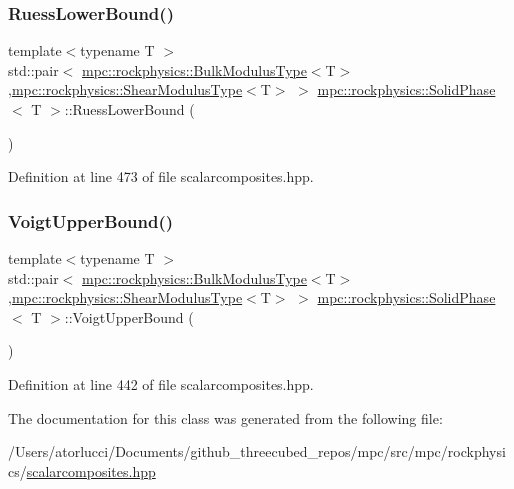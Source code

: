 \subsubsection{\texorpdfstring{Ruess\+Lower\+Bound()}{RuessLowerBound()}}
{\footnotesize\ttfamily template$<$typename T $>$ \\
std\+::pair$<$ \mbox{\hyperlink{structmpc_1_1rockphysics_1_1_bulk_modulus_type}{mpc\+::rockphysics\+::\+Bulk\+Modulus\+Type}}$<$T$>$,\mbox{\hyperlink{structmpc_1_1rockphysics_1_1_shear_modulus_type}{mpc\+::rockphysics\+::\+Shear\+Modulus\+Type}}$<$T$>$ $>$ \mbox{\hyperlink{classmpc_1_1rockphysics_1_1_solid_phase}{mpc\+::rockphysics\+::\+Solid\+Phase}}$<$ T $>$\+::Ruess\+Lower\+Bound (\begin{DoxyParamCaption}{ }\end{DoxyParamCaption})\hspace{0.3cm}{\ttfamily [inline]}}



Definition at line 473 of file scalarcomposites.\+hpp.

\mbox{\label{classmpc_1_1rockphysics_1_1_solid_phase_abd8c8414863cabddc4e30fc8364a5aef}} 
\subsubsection{\texorpdfstring{Voigt\+Upper\+Bound()}{VoigtUpperBound()}}
{\footnotesize\ttfamily template$<$typename T $>$ \\
std\+::pair$<$ \mbox{\hyperlink{structmpc_1_1rockphysics_1_1_bulk_modulus_type}{mpc\+::rockphysics\+::\+Bulk\+Modulus\+Type}}$<$T$>$,\mbox{\hyperlink{structmpc_1_1rockphysics_1_1_shear_modulus_type}{mpc\+::rockphysics\+::\+Shear\+Modulus\+Type}}$<$T$>$ $>$ \mbox{\hyperlink{classmpc_1_1rockphysics_1_1_solid_phase}{mpc\+::rockphysics\+::\+Solid\+Phase}}$<$ T $>$\+::Voigt\+Upper\+Bound (\begin{DoxyParamCaption}{ }\end{DoxyParamCaption})\hspace{0.3cm}{\ttfamily [inline]}}



Definition at line 442 of file scalarcomposites.\+hpp.



The documentation for this class was generated from the following file\+:\begin{DoxyCompactItemize}
\item 
/\+Users/atorlucci/\+Documents/github\+\_\+threecubed\+\_\+repos/mpc/src/mpc/rockphysics/\mbox{\hyperlink{scalarcomposites_8hpp}{scalarcomposites.\+hpp}}\end{DoxyCompactItemize}
